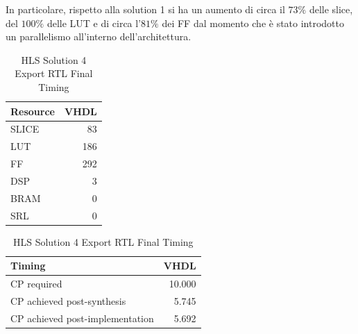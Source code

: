 In particolare, rispetto alla solution 1 si ha un aumento di circa il $73\%$ delle slice, del $100\%$ delle LUT e di circa l'$81\%$ dei FF dal momento che è stato introdotto un parallelismo all'interno dell'architettura.

\begin{table}[H]
	\centering
	\begin{minipage}[t]{0.45\linewidth}
		\centering
		\begin{tabular}{|l|r|}
			\hline
			\textbf{Resource} & \textbf{VHDL} \\
			\hline
			SLICE & 83 \\
			\hline
			LUT & 186 \\
			\hline
			FF & 292 \\
			\hline
			DSP & 3 \\
			\hline
			BRAM & 0 \\
			\hline
			SRL & 0 \\
			\hline
		\end{tabular}
		\caption{HLS Solution 4 Export RTL Resource Usage}
		\label{tab:hls-solution-4-export-rtl-resoruce-usage}
	\end{minipage}
	\hfill
	\begin{minipage}[t]{0.45\linewidth}
		\centering
		\begin{tabular}{|l|r|}
			\hline
			\textbf{Timing} & \textbf{VHDL} \\
			\hline
			CP required & 10.000 \\
			\hline
			CP achieved post-synthesis & 5.745 \\
			\hline
			CP achieved post-implementation & 5.692 \\
			\hline
		\end{tabular}
		\caption{HLS Solution 4 Export RTL Final Timing}
		\label{tab:hls-solution-4-export-rtl-final-timing}
	\end{minipage}
\end{table}